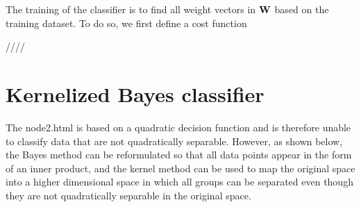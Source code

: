 \documentclass{article}
\begin{document}
The training of the classifier is to find all weight vectors in
${\bf W}$ based on the training dataset. To do so, we first define
a cost function


////


\section{Kernelized Bayes classifier}

The 
{node2.html} is based on a quadratic decision function and is therefore 
unable to classify data that are not quadratically separable. However,
as shown below, the Bayes method can be reformulated so that all data 
points appear in the form of an inner product, and the kernel method 
can be used to map the original space into a higher dimensional space 
in which all groups can be separated even though they are not 
quadratically separable in the original space.
\end{document}
